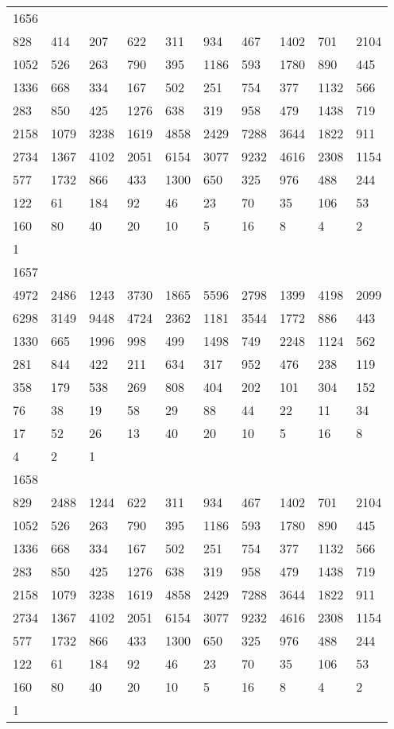 \begin{longtable}{*{10}{l}}
1656&&&&&&&&&\\
828& 414& 207& 622& 311& 934& 467& 1402& 701& 2104\\
1052& 526& 263& 790& 395& 1186& 593& 1780& 890& 445\\
1336& 668& 334& 167& 502& 251& 754& 377& 1132& 566\\
283& 850& 425& 1276& 638& 319& 958& 479& 1438& 719\\
2158& 1079& 3238& 1619& 4858& 2429& 7288& 3644& 1822& 911\\
2734& 1367& 4102& 2051& 6154& 3077& 9232& 4616& 2308& 1154\\
577& 1732& 866& 433& 1300& 650& 325& 976& 488& 244\\
122& 61& 184& 92& 46& 23& 70& 35& 106& 53\\
160& 80& 40& 20& 10& 5& 16& 8& 4& 2\\
1& \\

1657&&&&&&&&&\\
4972& 2486& 1243& 3730& 1865& 5596& 2798& 1399& 4198& 2099\\
6298& 3149& 9448& 4724& 2362& 1181& 3544& 1772& 886& 443\\
1330& 665& 1996& 998& 499& 1498& 749& 2248& 1124& 562\\
281& 844& 422& 211& 634& 317& 952& 476& 238& 119\\
358& 179& 538& 269& 808& 404& 202& 101& 304& 152\\
76& 38& 19& 58& 29& 88& 44& 22& 11& 34\\
17& 52& 26& 13& 40& 20& 10& 5& 16& 8\\
4& 2& 1& \\

1658&&&&&&&&&\\
829& 2488& 1244& 622& 311& 934& 467& 1402& 701& 2104\\
1052& 526& 263& 790& 395& 1186& 593& 1780& 890& 445\\
1336& 668& 334& 167& 502& 251& 754& 377& 1132& 566\\
283& 850& 425& 1276& 638& 319& 958& 479& 1438& 719\\
2158& 1079& 3238& 1619& 4858& 2429& 7288& 3644& 1822& 911\\
2734& 1367& 4102& 2051& 6154& 3077& 9232& 4616& 2308& 1154\\
577& 1732& 866& 433& 1300& 650& 325& 976& 488& 244\\
122& 61& 184& 92& 46& 23& 70& 35& 106& 53\\
160& 80& 40& 20& 10& 5& 16& 8& 4& 2\\
1& \\


\end{longtable}
